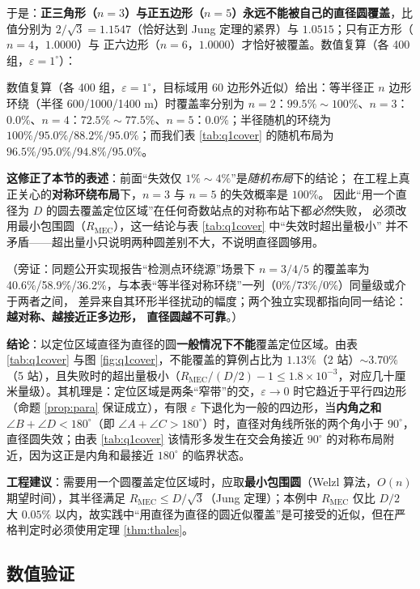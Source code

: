 \documentclass[withoutpreface,bwprint]{cumcmthesis}
\begin{document}
于是：\textbf{正三角形（$n=3$）与正五边形（$n=5$）永远不能被自己的直径圆覆盖}，比值分别为
$2/\sqrt3=1.1547$（恰好达到 Jung 定理的紧界）与 $1.0515$；只有正方形（$n=4$，$1.0000$）与
正六边形（$n=6$，$1.0000$）才恰好被覆盖。数值复算（各 400 组，$\varepsilon=1^\circ$）：

数值复算（各 400 组，$\varepsilon=1^\circ$，目标域用 60 边形外近似）给出：等半径正 $n$ 边形环绕（半径 600/1000/1400 m）时覆盖率分别为 $n=2$：$99.5\%\sim100\%$、$n=3$：\textbf{$0.0\%$}、$n=4$：$72.5\%\sim77.5\%$、$n=5$：\textbf{$0.0\%$}；半径随机的环绕为 $100\%/95.0\%/88.2\%/95.0\%$；而我们表 \ref{tab:q1cover} 的随机布局为 $96.5\%/95.0\%/94.8\%/95.0\%$。

\textbf{这修正了本节的表述}：前面“失效仅 $1\%\sim4\%$”是\emph{随机布局}下的结论；
在工程上真正关心的\textbf{对称环绕布局}下，$n=3$ 与 $n=5$ 的失效概率是 $100\%$。
因此“用一个直径为 $D$ 的圆去覆盖定位区域”在任何奇数站点的对称布站下都\emph{必然}失败，
必须改用最小包围圆（$R_{\mathrm{MEC}}$），这一结论与表 \ref{tab:q1cover} 中“失效时超出量极小”
并不矛盾——超出量小只说明两种圆差别不大，不说明直径圆够用。

（旁证：同题公开实现\cite{cumcm2026b-gh}报告“检测点环绕源”场景下 $n=3/4/5$ 的覆盖率为
40.6\%/58.9\%/36.2\%，与本表“等半径对称环绕”一列（0\%/73\%/0\%）同量级或介于两者之间，
差异来自其环形半径扰动的幅度；两个独立实现都指向同一结论：\textbf{越对称、越接近正多边形，
直径圆越不可靠}。）

\textbf{结论}：以定位区域直径为直径的圆\textbf{一般情况下不能}覆盖定位区域。由表 \ref{tab:q1cover} 与图 \ref{fig:q1cover}，不能覆盖的算例占比为 $1.13\%$（2 站）$\sim3.70\%$（5 站），且失败时的超出量极小（$R_{\mathrm{MEC}}/(D/2)-1\le1.8\times10^{-3}$，对应几十厘米量级）。其机理是：定位区域是两条“窄带”的交，$\varepsilon\to0$ 时它趋近于平行四边形（命题 \ref{prop:para} 保证成立），有限 $\varepsilon$ 下退化为一般的四边形，当\textbf{内角之和} $\angle B+\angle D<180^{\circ}$（即 $\angle A+\angle C>180^{\circ}$）时，直径对角线所张的两个角小于 $90^{\circ}$，直径圆失效；由表 \ref{tab:q1cover} 该情形多发生在交会角接近 $90^{\circ}$ 的对称布局附近，因为这正是内角和最接近 $180^{\circ}$ 的临界状态。

\textbf{工程建议}：需要用一个圆覆盖定位区域时，应取\textbf{最小包围圆}（Welzl 算法，$O(n)$ 期望时间），其半径满足 $R_{\mathrm{MEC}}\le D/\sqrt3$（Jung 定理）；本例中 $R_{\mathrm{MEC}}$ 仅比 $D/2$ 大 $0.05\%$ 以内，故实践中“用直径为直径的圆近似覆盖”是可接受的近似，但在严格判定时必须使用定理 \ref{thm:thales}。

\subsection{数值验证}
\end{document}

